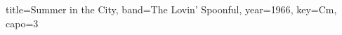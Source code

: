 \documentclass{skrul-leadsheet}
\begin{document}
\begin{song}[transpose-capo=true]{title={Summer in the City}, band={The Lovin' Spoonful}, year={1966}, key={Cm}, capo={3}}



\end{song}
\end{document}

